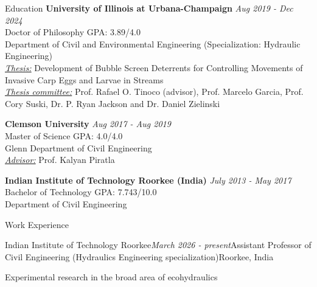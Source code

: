 \documentclass{resume} %
\begin{document}

\begin{rSection}{Education}
{\bf University of Illinois at Urbana-Champaign} \hfill {\em Aug 2019 - Dec 2024} 
\\ Doctor of Philosophy \hfill {GPA: 3.89/4.0}
\\ Department of Civil and Environmental Engineering (Specialization: Hydraulic Engineering)
\\ \underline{\textit{Thesis:}} Development of Bubble Screen Deterrents for Controlling Movements of Invasive Carp Eggs and Larvae in Streams
\\ \underline{\textit{Thesis committee:}} Prof. Rafael O. Tinoco (advisor), Prof. Marcelo Garcia, Prof. Cory Suski, Dr. P. Ryan Jackson and Dr. Daniel Zielinski


{\bf Clemson University} \hfill {\em Aug 2017 - Aug 2019 } 
\\ Master of Science \hfill {GPA: 4.0/4.0}
\\ Glenn Department of Civil Engineering
\\ \underline{\textit{Advisor:}} Prof. Kalyan Piratla 

{\bf Indian Institute of Technology Roorkee (India) }  \hfill {\em July 2013 - May 2017}
\\Bachelor of Technology \hfill {GPA: 7.743/10.0}
\\Department of Civil Engineering



\begin{rSection}{Work Experience}
\begin{rSubsection}{Indian Institute of Technology Roorkee}{\em March 2026 - present}{Assistant Professor of Civil Engineering (Hydraulics Engineering specialization)}{Roorkee, India}
\item Experimental research in the broad area of ecohydraulics 
\end{rSubsection}


\end{rSection}
\end{rSection}
\end{document}
